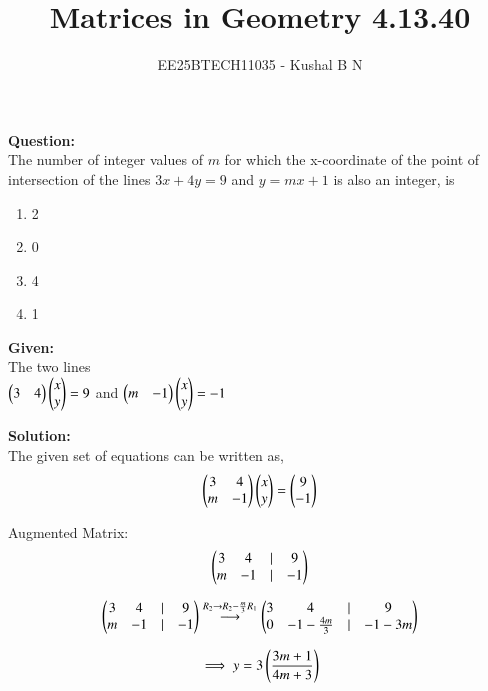 \documentclass[journal,12pt,onecolumn]{IEEEtran}
\title{Matrices in Geometry 4.13.40}
\author{EE25BTECH11035 - Kushal B N}
\theoremstyle{remark}
\begin{document}
\vspace{3cm}
\maketitle
{\let\newpage\relax\maketitle}
\textbf{Question: }\\
The number of integer values of $m$ for which the x-coordinate of the point of intersection of the lines $3x + 4y = 9$ and $y = mx + 1$ is also an integer, is
\begin{multicols}{4}
\begin{enumerate}
    \item 2
    \item 0
    \item 4
    \item 1
\end{enumerate}
\end{multicols}

\textbf{Given: } \\
The two lines\\
$\begin{pmatrix}3&4\end{pmatrix}\begin{pmatrix}x\\y\end{pmatrix}=9$ and $\begin{pmatrix}m&-1\end{pmatrix}\begin{pmatrix}x\\y\end{pmatrix}=-1$

\textbf{Solution: }\\
The given set of equations can be written as,
\begin{equation}
    \begin{pmatrix}3&4\\m&-1\end{pmatrix}\begin{pmatrix}x\\y\end{pmatrix} = \begin{pmatrix}9\\-1\end{pmatrix}
\end{equation}

Augmented Matrix:
\begin{equation}
    \begin{pmatrix}3&4&|&9\\m&-1&|&-1\end{pmatrix}
\end{equation}

\begin{equation}
    \begin{pmatrix}3&4&|&9\\m&-1&|&-1\end{pmatrix} \overset{R_2 \rightarrow R_2 - \frac{m}{3}R_1}{\longrightarrow} \begin{pmatrix}3&4&|&9\\0&-1-\frac{4m}{3}&|&-1-3m\end{pmatrix}
\end{equation}

\begin{equation}
    \implies y = 3\left(\frac{3m+1}{4m+3}\right)
\end{equation}
\end{document}
